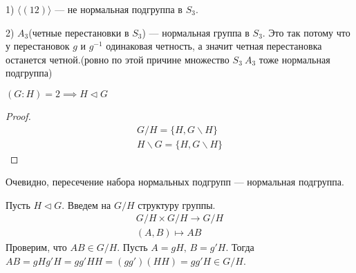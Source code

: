 \documentclass[../main.tex]{subfiles}
\begin{document}
\begin{examples}
    1) $\langle (1 2) \rangle$ --- не нормальная подгруппа в $S_3$.

    2) $A_3$(четные перестановки в $S_3$) --- нормальная группа в $S_3$. Это так потому что у перестановок $g$ и $g^{-1}$ одинаковая четность, а значит четная перестановка останется четной.(ровно по этой причине множество $S_3 \ A_3$ тоже нормальная подгруппа)
\end{examples}
\begin{remark}
    $(G : H) = 2 \implies H \triangleleft G$
\end{remark}
\begin{proof}
    \begin{equation*}
        \begin{gathered}
            G / H = \{H, G \backslash H\}\\
            H \backslash G = \{H, G \backslash H\}
        \end{gathered}
    \end{equation*}
\end{proof}

\begin{remark}
Очевидно, пересечение набора нормальных подгрупп --- нормальная подгруппа.
\end{remark}

Пусть $H \triangleleft G$. Введем на $G / H$ структуру группы.
\begin{equation*}
    \begin{gathered}
        G/H \times G/H \to G/H \\
        (A, B) \mapsto AB
    \end{gathered}
\end{equation*}
Проверим, что $AB \in G/H$. Пусть $A = gH, \, B = g'H$. Тогда $AB = gHg'H = gg'HH = (gg')(HH) = gg'H \in G/H$.
\end{document}

